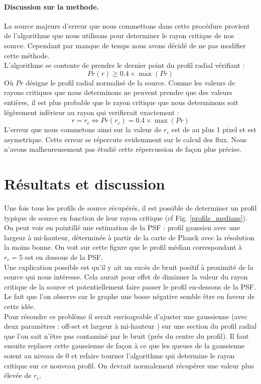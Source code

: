 \documentclass[a4paper,11pt]{article}
\begin{document}
\paragraph{Discussion sur la methode.} La source majeure d'erreur que nous commettons dans cette procédure provient 
de l'algorithme que nous utilisons pour determiner le rayon critique de nos source. Cependant par manque de temps
 nous avons décidé de ne pas modifier cette méthode. \\
 L'algorithme se contente de prendre le dernier point du profil radial vérifiant : 
 \begin{equation}
 Pr(r) \ge 0.4\times \max (Pr)
 \end{equation}
 Où $Pr$ désigne le profil radial normalisé de la source. 
Comme les valeurs de rayons critiques que nous determinons ne
peuvent prendre que des valeurs entières, il est plus probable que le rayon critique que nous determinons soit légèrement inférieur au 
rayon qui verifierait exactement : 
\begin{equation}
r = r_c \Leftrightarrow Pr(r_c) = 0.4\times \max (Pr)
\end{equation}
L'erreur que nous commetons ainsi sur la valeur de $r_c$ est de au plus 1 pixel et est asymetrique. Cette erreur 
se répercute evidemment sur le calcul des flux. Nous n'avons malheureusement pas étudié cette répercussion de
façon plus précise.



\section{Résultats et discussion}
Une fois tous les profils de source récupérés, il est possible de determiner un profil typique de source
en fonction de leur rayon critique (cf Fig. \ref{profils_medians}). On peut voir en pointillé une estimation de 
la PSF : profil gaussien avec une largeur à mi-hauteur, déterminée à partir de la carte de Planck 
avec la résolution la moins bonne. On voit sur cette figure que le profil médian correspondant à 
$r_c = 5 $ est en dessous de la PSF. \\
Une explication possible est qu'il y ait un excès de bruit positif à proximité de la source qui nous intéresse.
Cela aurait pour effet de diminuer la valeur du rayon critique de la source et potentiellement faire passer 
le profil en-dessous de la PSF. Le fait que l'on observe sur le graphe une bosse négative semble être en faveur
de cette idée. \\
Pour résoudre ce problème il serait envisageable d'ajuster une gaussienne (avec deux
paramètres : off-set et largeur à mi-hauteur ) sur une section du profil radial que l'on sait n'être
pas contaminé par le bruit (près du centre du profil). Il faut ensuite replacer cette gaussienne de façon à ce que les queues de
la gaussienne soient au niveau de 0 et refaire tourner l'algorithme qui determine le rayon critique
sur ce nouveau profil. On devrait normalement récupérer une valeur plus élevée de $r_c$.
\end{document}
